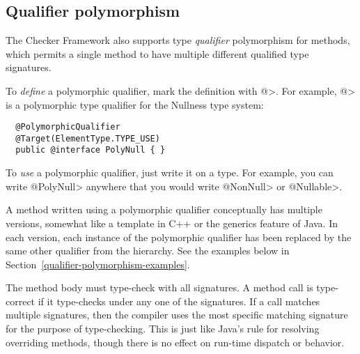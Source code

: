 



\subsection{Qualifier polymorphism\label{qualifier-polymorphism}}

The Checker Framework also supports type \emph{qualifier} polymorphism for
methods, which permits a single method to have multiple different qualified
type signatures.

To \emph{define} a polymorphic qualifier, mark the definition with
\<@>.  For example,
\<@> is a polymorphic type
qualifier for the Nullness type system:

\begin{Verbatim}
  @PolymorphicQualifier
  @Target(ElementType.TYPE_USE)
  public @interface PolyNull { }
\end{Verbatim}

To \emph{use} a polymorphic qualifier, just write it on a type.
For example, you can write \<@PolyNull> anywhere that you would write
\<@NonNull> or \<@Nullable>.

A method written using a polymorphic qualifier conceptually has multiple
versions, somewhat like a template in C++ or the generics feature of Java.
In each version, each instance of the polymorphic qualifier has been
replaced by the same other qualifier from the hierarchy.  See the examples
below in Section~\ref{qualifier-polymorphism-examples}.

The method body must type-check with all signatures.  A method call is
type-correct if it type-checks under any one of the signatures.  If a call
matches multiple signatures, then the compiler uses the most specific
matching signature for the purpose of type-checking.  This is just like
Java's rule for resolving overriding methods, though there is no effect on
run-time dispatch or behavior.

